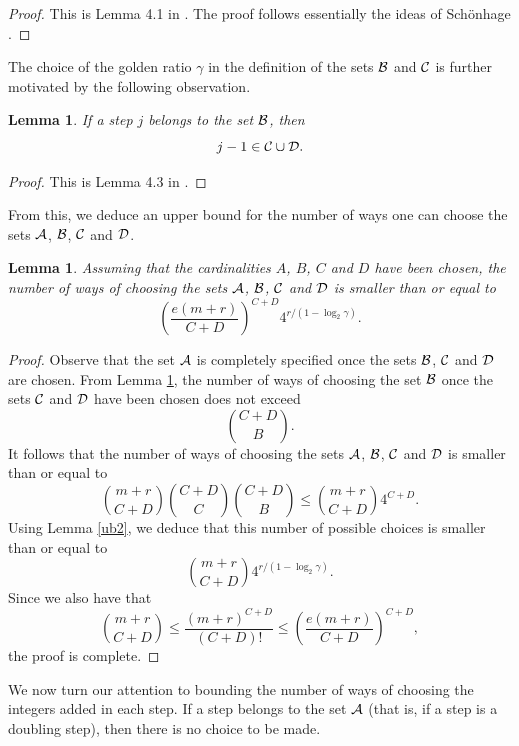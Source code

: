 \documentclass{article}
\newtheorem{lemma}[theorem]{Lemma}
\theoremstyle{definition}
\begin{document}
\begin{proof}
This is Lemma 4.1 in \cite{DKN}. The proof follows essentially the ideas of Sch\"onhage \cite{schonhage}.
\end{proof}
The choice of the golden ratio $\gamma$ in the definition of the sets ${\cal B}$ and ${\cal C}$ is further motivated by the following observation.

\begin{lemma}\label{ub3}
If a step $j$ belongs to the set ${\cal B}$, then
$$
j-1\in {\cal C}\cup {\cal D}.
$$
\end{lemma}
\begin{proof}
This is Lemma 4.3 in \cite{DKN}.
\end{proof}

From this, we deduce an upper bound for the number of ways one can choose the sets ${\cal A}$, ${\cal B}$, ${\cal C}$ and ${\cal D}$.

\begin{lemma}\label{ub4}
Assuming that the cardinalities $A$, $B$, $C$ and $D$ have been chosen, the number of ways of choosing the sets ${\cal A}$, ${\cal B}$, ${\cal C}$ and ${\cal D}$ is smaller than or equal to
$$
\left(\frac{e(m+r)}{C+D}\right)^{C+D}4^{r/(1-\log_2\gamma)}.
$$
\end{lemma}


\begin{proof}
Observe that the set ${\cal A}$ is completely specified once the sets ${\cal B}$, ${\cal C}$ and ${\cal D}$ are chosen.  From Lemma \ref{ub3}, the number of ways of choosing the set ${\cal B}$ once the sets ${\cal C}$ and ${\cal D}$ have been chosen does not exceed
$$
{C+D\choose B}.
$$
It follows that the number of ways of choosing the sets ${\cal A}$, ${\cal B}$, ${\cal C}$  and ${\cal D}$ is smaller than or equal to
$$
{m+r \choose C+D}{C+D\choose C}{C+D\choose B}\le {m+r \choose C+D} 4^{C+D}.
$$
Using Lemma \ref{ub2}, we deduce that this number of possible choices is smaller than or equal to
$$
{m+r \choose C+D}4^{r/(1-\log_2\gamma)}.
$$
Since we also have that
$$
{m+r\choose C+D}\le \frac{(m+r)^{C+D}}{(C+D)!}\le \left(\frac{e(m+r)}{C+D}\right)^{C+D},
$$
the proof is complete.
\end{proof}
We now turn our attention to bounding the number of ways of choosing the integers added in each step.  If a step belongs to the set ${\cal A}$ (that is, if a step is a doubling step), then there is no choice to be made.
\end{document}
